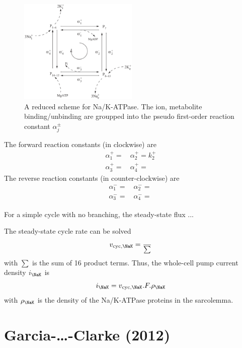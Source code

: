 \begin{figure}[hbt]
  \centerline{\includegraphics[height=5cm,
    angle=0]{./images/SmithCrampin_NaK.eps}}
 \caption{A reduced scheme for Na/K-ATPase. The ion, metabolite
   binding/unbinding are groupped into the pseudo first-order reaction
 constant $\alpha^\pm_j$}
\label{fig:SmithCrampin_NaK}
\end{figure}
The forward reaction constants (in clockwise) are
\begin{equation}
  \label{eq:1201}
  \begin{array}{ll}
    \alpha^+_1 = \frac{}{} & \alpha^+_2 = k^+_2 \\
    \alpha^+_3 = \frac{}{} & \alpha^+_4 = \frac{}{}
  \end{array}
\end{equation}
The reverse reaction constants (in counter-clockwise) are
\begin{equation}
  \label{eq:1202}
  \begin{array}{ll}
    \alpha^-_1 = \frac{}{} & \alpha^-_2 = \frac{}{} \\
    \alpha^-_3 = \frac{}{} & \alpha^-_4 = \frac{}{}    
  \end{array}
\end{equation}

For a simple cycle with no branching, the steady-state flux ...


The steady-state cycle rate can be solved
\begin{equation}
  \label{eq:1203}
  v_{\text{cyc},\NaK} = \frac{}{\sum}
\end{equation}
with $\sum$ is the sum of 16 product terms.
Thus, the whole-cell pump current density $i_\NaK$ is
\begin{equation}
  \label{eq:1204}
  i_\NaK = v_{\text{cyc},\NaK} .F. \rho_\NaK
\end{equation}
with $\rho_\NaK$ is the density of the Na/K-ATPase proteins in the
sarcolemma. 


\section{Garcia-\ldots-Clarke (2012)}

\citep{garcia2012}


